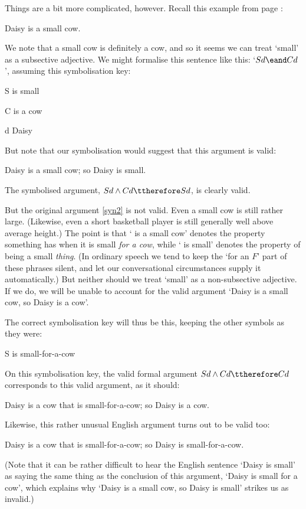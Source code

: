 Things are a bit more complicated, however. Recall this example from page \pageref{daisy}:
\begin{earg}
	\item[] Daisy is a small cow.
\end{earg} We note that a small cow is definitely a cow, and so it seems we can treat `small' as a subsective adjective. We might formalise this sentence like this: `$Sd \eand Cd$', assuming this symbolisation key:
	\begin{ekey}
		\item[S]  is small
		\item[C]  is a cow
		\item[d] Daisy
	\end{ekey}
But note that our symbolisation would suggest that this argument is valid: \begin{earg}
	\item[\ex{syn2}] Daisy is a small cow; so Daisy is small.
\end{earg} The symbolised argument, $Sd \wedge Cd \ttherefore Sd$, is clearly valid.

But the original argument \ref{syn2} is not valid. Even a small cow is still rather large. (Likewise, even a short basketball player is still generally well above average height.) The point is that ` is a small cow' denotes the property something has when it is small \emph{for a cow}, while ` is small' denotes the property of being a small \emph{thing}. (In ordinary speech we tend to keep the  `for an $F$' part of these phrases silent, and let our conversational circumstances supply it automatically.) But neither should we treat `small' as a non-subsective adjective. If we do, we will be unable to account for the valid argument `Daisy is a small cow, so Daisy is a cow'. 

The correct symbolisation key will thus be this, keeping the other symbols as they were: 
	\begin{ekey}
		\item[S]  is small-for-a-cow
	\end{ekey} On this symbolisation key, the valid formal argument $Sd \wedge Cd \ttherefore Cd$ corresponds to this valid argument, as it should:
	\begin{earg}
		\item[] Daisy is a cow that is small-for-a-cow; so Daisy is a cow.
	\end{earg} 
Likewise, this rather unusual English argument turns out to be valid too: \begin{earg}
		\item[] Daisy is a cow that is small-for-a-cow; so Daisy is small-for-a-cow.
	\end{earg} (Note that it can be rather difficult to hear the English sentence `Daisy is small' as saying the same thing as the conclusion of this argument, `Daisy is small for a cow', which explains why `Daisy is a small cow, so Daisy is small' strikes us as invalid.)

